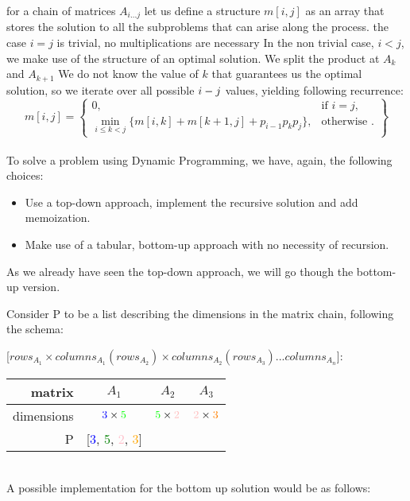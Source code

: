 for a chain of matrices $A_{i...j}$ let us define a structure $m[i, j]$ as an array
that stores the solution to all the subproblems that can arise along the
process. the case $i = j$ is trivial, no multiplications are necessary
In the non trivial case, $i < j$, we make use of the structure of an optimal
solution. We split the product at $A_k$ and $A_{k+1}$
We do not know the value of $k$ that guarantees us the optimal solution, so
we iterate over all possible $i\-- j$ values, yielding following recurrence:
 \\
  \[
    m[i,j] = \left\{\begin{array}{lr}
      0, & \text{if } i = j,\\
      \min_{i \leq k < j}\{m[i,k] + m[k+1, j] + p_{i-1}p_{k}p_{j}\}, & \text{otherwise }.
      \end{array}\right\}
  \]
  \\

To solve a problem using Dynamic Programming, we have, again, the following choices:

\begin{itemize}
  \item Use a top-down approach, implement the recursive solution and add memoization.
  \item Make use of a tabular, bottom-up approach with no necessity of recursion.
\end{itemize}

As we already have seen the top-down approach, we will go though the bottom-up version.

Consider P to be a list describing the dimensions in the matrix chain, following the schema:

[$rows_{A_{1}}  \times columns_{A_{1}}(rows_{A_{2}}) \times columns_{A_{2}} (rows_{A_{3}}) ... columns_{A_{n}}$]:

 \begin{tabular}{r|ccc}
    matrix & $A_1$ & $A_2$ & $A_3$ \\
    \hline 
    dimensions & $\textcolor{blue}{3} \times \textcolor{green}{5}$ & $\textcolor{green}{5} \times \textcolor{pink}{2}$ & $\textcolor{pink}{2} \times \textcolor{orange}{3}$ \\
    P & [\textcolor{blue}{3}, \textcolor{green}{5}, \textcolor{pink}{2}, \textcolor{orange}{3}]
  \end{tabular}
\\ 

A possible implementation for the bottom up solution would be as follows:

